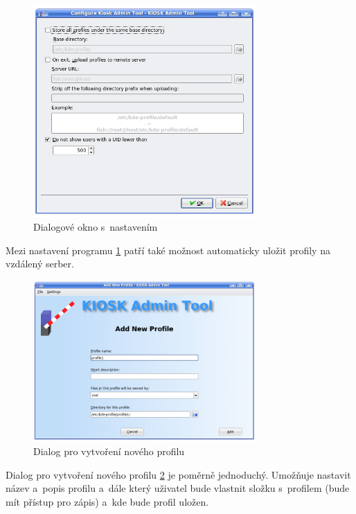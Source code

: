 \begin{figure}[h]
    \centering
    \includegraphics[width=8.5cm]{obrazky/KioskToolKDE3/nastaveni.png}
    \caption{Dialogové okno s~nastavením}
    \label{fig:kt3_nastaveni}
\end{figure}
Mezi nastavení programu \ref{fig:kt3_nastaveni} patří také možnost automaticky
uložit profily na vzdálený serber.

\begin{figure}[h]
    \centering
    \includegraphics[width=8.5cm]{obrazky/KioskToolKDE3/novy_profil.png}
    \caption{Dialog pro vytvoření nového profilu}
    \label{fig:kt3_novyprofil}
\end{figure}
Dialog pro vytvoření nového profilu \ref{fig:kt3_novyprofil} je poměrně
jednoduchý. Umožňuje nastavit název a~popis profilu a~dále který uživatel bude
vlastnit složku s~profilem (bude mít přístup pro zápis) a~kde bude profil
uložen.


